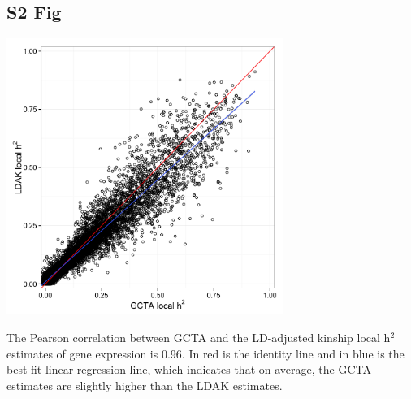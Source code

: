 \documentclass[10pt,letterpaper]{article}
\begin{document}
\begin{singlespace}
\subsection*{S2 Fig}
\includegraphics[width=9cm]{Figures/Fig-LDAK-gcta-no-cons.png}
\label{S2_Fig}

 The Pearson correlation between GCTA and the LD-adjusted kinship local h$^2$ estimates of gene expression is 0.96. In red is the identity line and in blue is the best fit linear regression line, which indicates that on average, the GCTA estimates are slightly higher than the LDAK estimates.


\end{singlespace}
\end{document}
